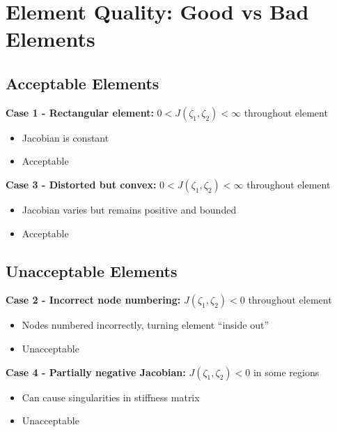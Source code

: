 \documentclass[
  11pt,
  a4paper,
]{scrbook}
\providecommand{\tightlist}{%
  \setlength{\itemsep}{0pt}\setlength{\parskip}{0pt}}\usepackage{longtable,booktabs,array}
\begin{document}
\section{Element Quality: Good vs Bad
Elements}\label{element-quality-good-vs-bad-elements}

\subsection{Acceptable Elements}\label{acceptable-elements}

\textbf{Case 1 - Rectangular element:}
\(0 < J(\zeta_1, \zeta_2) < \infty\) throughout element

\begin{itemize}
\tightlist
\item
  Jacobian is constant
\item
  Acceptable
\end{itemize}

\textbf{Case 3 - Distorted but convex:}
\(0 < J(\zeta_1, \zeta_2) < \infty\) throughout element

\begin{itemize}
\tightlist
\item
  Jacobian varies but remains positive and bounded
\item
  Acceptable
\end{itemize}

\subsection{Unacceptable Elements}\label{unacceptable-elements}

\textbf{Case 2 - Incorrect node numbering:} \(J(\zeta_1, \zeta_2) < 0\)
throughout element

\begin{itemize}
\tightlist
\item
  Nodes numbered incorrectly, turning element ``inside out''
\item
  Unacceptable
\end{itemize}

\textbf{Case 4 - Partially negative Jacobian:}
\(J(\zeta_1, \zeta_2) < 0\) in some regions

\begin{itemize}
\tightlist
\item
  Can cause singularities in stiffness matrix
\item
  Unacceptable
\end{itemize}
\end{document}
